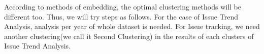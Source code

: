 According to methods of embedding, the optimal clustering methods will be different too. Thus, we will try steps as follows. For the case of Issue Trend Analysis, analysis per year of whole dataset is needed. For Issue tracking, we need another clustering(we call it Second Clustering) in the results of each clusters of Issue Trend Analysis.